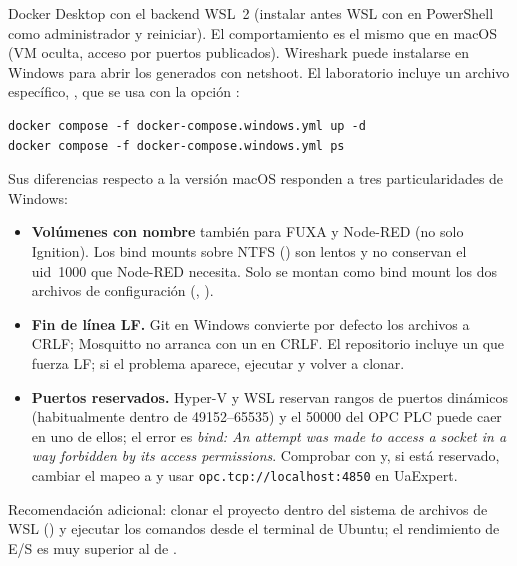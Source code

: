 Docker Desktop con el backend WSL~2 (instalar antes WSL con  en PowerShell como administrador y reiniciar). El comportamiento es el mismo que en macOS (VM oculta, acceso por puertos publicados). Wireshark puede instalarse en Windows para abrir los  generados con netshoot. El laboratorio incluye un archivo específico, , que se usa con la opción :

\begin{lstlisting}[style=bash]
docker compose -f docker-compose.windows.yml up -d
docker compose -f docker-compose.windows.yml ps
\end{lstlisting}

Sus diferencias respecto a la versión macOS responden a tres particularidades de Windows:

\begin{itemize}
  \item \textbf{Volúmenes con nombre} también para FUXA y Node-RED (no solo Ignition). Los bind mounts sobre NTFS () son lentos y no conservan el uid~1000 que Node-RED necesita. Solo se montan como bind mount los dos archivos de configuración (, ).
  \item \textbf{Fin de línea LF.} Git en Windows convierte por defecto los archivos a CRLF; Mosquitto no arranca con un  en CRLF. El repositorio incluye un  que fuerza LF; si el problema aparece, ejecutar  y volver a clonar.
  \item \textbf{Puertos reservados.} Hyper-V y WSL reservan rangos de puertos dinámicos (habitualmente dentro de 49152--65535) y el 50000 del OPC PLC puede caer en uno de ellos; el error es \emph{bind: An attempt was made to access a socket in a way forbidden by its access permissions}. Comprobar con  y, si está reservado, cambiar el mapeo a  y usar \nolinkurl{opc.tcp://localhost:4850} en UaExpert.
\end{itemize}

Recomendación adicional: clonar el proyecto dentro del sistema de archivos de WSL () y ejecutar los comandos desde el terminal de Ubuntu; el rendimiento de E/S es muy superior al de .

